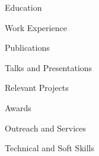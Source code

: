 \documentclass{resume} %
\begin{document}


\begin{rSection}{\sc Education}
    
    
    
\end{rSection}

\vspace*{0.5\baselineskip} 
\begin{rSection}{\sc Work Experience}
    
    
    
    
\end{rSection}

\vspace*{0.5\baselineskip} 
\begin{rSection}{\sc Publications}
    
\end{rSection}

\vspace*{0.5\baselineskip} 
\begin{rSection}{\sc Talks and Presentations}
    
\end{rSection}

\vspace*{0.5\baselineskip} 
\begin{rSection}{\sc Relevant Projects} %
    
    
    
    
    
\end{rSection}

\vspace*{0.5\baselineskip} 
\begin{rSection}{\sc Awards}
    
\end{rSection}

\vspace*{0.5\baselineskip} 
\begin{rSection}{\sc Outreach and Services}
    
\end{rSection}

\vspace*{0.5\baselineskip} 
\begin{rSection}{\sc Technical and Soft Skills}
    
\end{rSection}

\pagestyle{fancy}
\fancyfoot{}
\cfoot{\thepage} %
\end{document}
